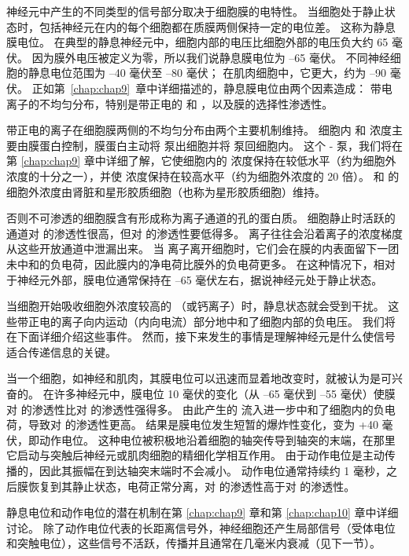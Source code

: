 神经元中产生的不同类型的信号部分取决于细胞膜的电特性。 
当细胞处于静止状态时，包括神经元在内的每个细胞都在质膜两侧保持一定的电位差。 
这称为静息膜电位。 
在典型的静息神经元中，细胞内部的电压比细胞外部的电压负大约 65 毫伏。
因为膜外电压被定义为零，所以我们说静息膜电位为 –65 毫伏。 
不同神经细胞的静息电位范围为 –40 毫伏至 –80 毫伏； 
在肌肉细胞中，它更大，约为 –90 毫伏。 
正如第~\ref{chap:chap9}~章中详细描述的，静息膜电位由两个因素造成：
带电离子的不均匀分布，特别是带正电的  和 ，以及膜的选择性渗透性。


带正电的离子在细胞膜两侧的不均匀分布由两个主要机制维持。 
细胞内  和  浓度主要由膜蛋白控制，膜蛋白主动将  泵出细胞并将  泵回细胞内。 
这个 - 泵，我们将在第 \ref{chap:chap9} 章中详细了解，它使细胞内的  浓度保持在较低水平（约为细胞外浓度的十分之一），并使  浓度保持在较高水平（约为细胞外浓度的 20 倍）。 
 和  的细胞外浓度由肾脏和星形胶质细胞（也称为星形胶质细胞）维持。


否则不可渗透的细胞膜含有形成称为离子通道的孔的蛋白质。 细胞静止时活跃的通道对  的渗透性很高，但对  的渗透性要低得多。 
 离子往往会沿着离子的浓度梯度从这些开放通道中泄漏出来。 
当  离子离开细胞时，它们会在膜的内表面留下一团未中和的负电荷，因此膜内的净电荷比膜外的负电荷更多。 
在这种情况下，相对于神经元外部，膜电位通常保持在 –65 毫伏左右，据说神经元处于静止状态。


当细胞开始吸收细胞外浓度较高的 （或钙离子）时，静息状态就会受到干扰。 
这些带正电的离子向内运动（内向电流）部分地中和了细胞内部的负电压。 
我们将在下面详细介绍这些事件。 
然而，接下来发生的事情是理解神经元是什么使信号适合传递信息的关键。


当一个细胞，如神经和肌肉，其膜电位可以迅速而显着地改变时，就被认为是可兴奋的。 
在许多神经元中，膜电位 10 毫伏的变化（从 –65 毫伏到 –55 毫伏）使膜对  的渗透性比对  的渗透性强得多。 
由此产生的  流入进一步中和了细胞内的负电荷，导致对  的渗透性更高。 
结果是膜电位发生短暂的爆炸性变化，变为 +40 毫伏，即动作电位。 
这种电位被积极地沿着细胞的轴突传导到轴突的末端，在那里它启动与突触后神经元或肌肉细胞的精细化学相互作用。 
由于动作电位是主动传播的，因此其振幅在到达轴突末端时不会减小。 
动作电位通常持续约 1 毫秒，之后膜恢复到其静止状态，电荷正常分离，对  的渗透性高于对  的渗透性。


静息电位和动作电位的潜在机制在第 \ref{chap:chap9} 章和第 \ref{chap:chap10} 章中详细讨论。
除了动作电位代表的长距离信号外，神经细胞还产生局部信号（受体电位和突触电位），这些信号不活跃，传播并且通常在几毫米内衰减（见下一节）。


